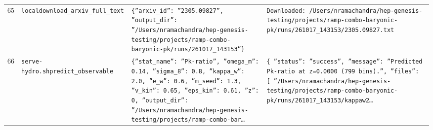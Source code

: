 \documentclass[11pt,a4paper]{article}
\begin{document}
\begin{longtable}{@{}p{}p{}p{}p{}@{}}
65 & \texttt{local}\newline\texttt{download\_\allowbreak{}arxiv\_\allowbreak{}full\_\allowbreak{}text} & \texttt{\{''arxiv\_\allowbreak{}id'':\allowbreak{} ''2305.09827'',\allowbreak{} ''output\_\allowbreak{}dir'':\allowbreak{} ''/\allowbreak{}Users/\allowbreak{}nramachandra/\allowbreak{}hep-genesis-testing/\allowbreak{}projects/\allowbreak{}ramp-combo-baryonic-pk/\allowbreak{}runs/\allowbreak{}261017\_\allowbreak{}143153''\}\allowbreak{}} & \texttt{Downloaded:\allowbreak{} /\allowbreak{}Users/\allowbreak{}nramachandra/\allowbreak{}hep-genesis-testing/\allowbreak{}projects/\allowbreak{}ramp-combo-baryonic-pk/\allowbreak{}runs/\allowbreak{}261017\_\allowbreak{}143153/\allowbreak{}2305.09827.txt} \\
66 & \texttt{serve-hydro.sh}\newline\texttt{predict\_\allowbreak{}observable} & \texttt{\{''stat\_\allowbreak{}name'':\allowbreak{} ''Pk-ratio'',\allowbreak{} ''omega\_\allowbreak{}m'':\allowbreak{} 0.14,\allowbreak{} ''sigma\_\allowbreak{}8'':\allowbreak{} 0.8,\allowbreak{} ''kappa\_\allowbreak{}w'':\allowbreak{} 2.0,\allowbreak{} ''e\_\allowbreak{}w'':\allowbreak{} 0.6,\allowbreak{} ''m\_\allowbreak{}seed'':\allowbreak{} 1.3,\allowbreak{} ''v\_\allowbreak{}kin'':\allowbreak{} 0.65,\allowbreak{} ''eps\_\allowbreak{}kin'':\allowbreak{} 0.61,\allowbreak{} ''z'':\allowbreak{} 0,\allowbreak{} ''output\_\allowbreak{}dir'':\allowbreak{} ''/\allowbreak{}Users/\allowbreak{}nramachandra/\allowbreak{}hep-genesis-testing/\allowbreak{}projects/\allowbreak{}ramp-combo-bar\ldots{}\allowbreak{}} & \texttt{\{   ''status'':\allowbreak{} ''success'',\allowbreak{}   ''message'':\allowbreak{} ''Predicted Pk-ratio at z=\allowbreak{}0.0000 (799 bins)\allowbreak{}.'',\allowbreak{}   ''files'':\allowbreak{} [     ''/\allowbreak{}Users/\allowbreak{}nramachandra/\allowbreak{}hep-genesis-testing/\allowbreak{}projects/\allowbreak{}ramp-combo-baryonic-pk/\allowbreak{}runs/\allowbreak{}261017\_\allowbreak{}143153/\allowbreak{}kappaw2\ldots{}\allowbreak{}} \\

\end{longtable}
\end{document}
